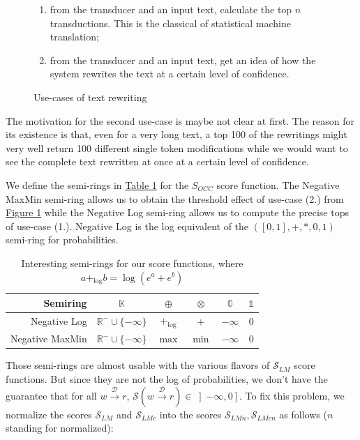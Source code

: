 \documentclass[a4paper, 11pt, onepage]{scrreprt}
\newcommand\tableref[1]{\hyperref[#1]{Table \ref*{#1}}}
\newcommand\figureref[1]{\hyperref[#1]{Figure \ref*{#1}}}
\newcommand\maps[1]{\xrightarrow{\mathcal{#1}}}
\begin{document}
\begin{figure}[H]
  \centering
  \begin{enumerate}
  \item from the transducer and an input text, calculate the top $n$
    transductions. This is the classical of statistical machine
    translation;
  \item from the transducer and an input text, get an idea of how the
    system rewrites the text at a certain level of confidence.
  \end{enumerate}
  
  \caption{Use-cases of text rewriting}
\label{fig:use-cases}
\end{figure}

The motivation for the second use-case is maybe not clear at
first. The reason for its existence is that, even for a very long
text, a top 100 of the rewritings might very well return 100 different
single token modifications while we would want to see the complete
text rewritten at once at a certain level of confidence.

We define the semi-rings in \tableref{tab:semi-rings} for the
$S_{OCC}$ score function. The Negative MaxMin semi-ring allows us to
obtain the threshold effect of use-case (2.) from
\figureref{fig:use-cases} while the Negative Log semi-ring allows us
to compute the precise tops of use-case (1.). Negative Log is the log
equivalent of the $(\left[0, 1\right], +, *, 0, 1)$ semi-ring for
probabilities.

\begin{table}[H]
  \centering
  \begin{tabular}{rccccc}
    \toprule
    Semiring & $\mathbb{K}$ & $\oplus$ & $\otimes$ & $\mathbb{0}$ & $\mathbb{1}$
    \\
    \midrule
    Negative Log & $\mathbb{R}^{-} \cup \{-\infty\}$ & $+_{\log}$ & $+$ & $-\infty$ & $0$ \\
    Negative MaxMin & $\mathbb{R}^{-} \cup \{-\infty\}$ & $\max$ & $\min$ & $-\infty$ & $0$ \\
  \end{tabular}
  \caption{Interesting semi-rings for our score functions, where
    $a +_{\log} b = \log\left(e^a + e^b\right)$}
  \label{tab:semi-rings}
\end{table}

Those semi-rings are almost usable with the various flavors of
$\mathcal{S}_{LM}$ score functions. But since they are not the log of
probabilities, we don't have the guarantee that for all $w \maps{D}
r$, $\mathcal{S} \left( w \maps{D} r \right) \in \left]-\infty,
  0\right]$. To fix this problem, we normalize the scores
$\mathcal{S}_{LM}$ and $\mathcal{S}_{LMc}$ into the scores
$\mathcal{S}_{LMn}, \mathcal{S}_{LMcn}$ as follows ($n$ standing for
normalized):
\end{document}
